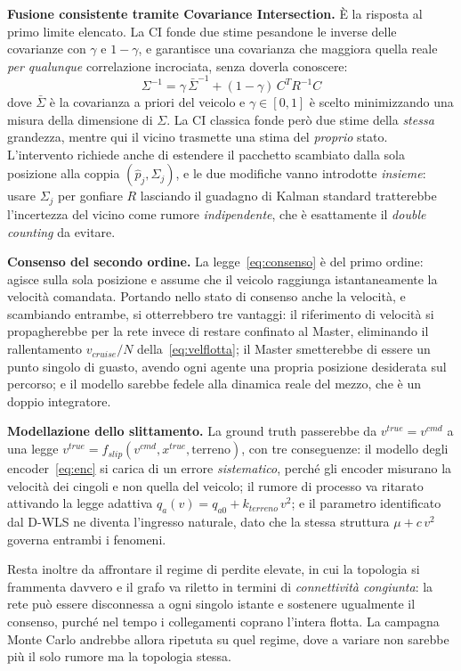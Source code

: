 \documentclass[conference,9pt]{IEEEtran}
\begin{document}
\textbf{Fusione consistente tramite Covariance Intersection.} \`E la risposta
al primo limite elencato. La CI \cite{julier1997} fonde due stime pesandone le
inverse delle covarianze con $\gamma$ e $1-\gamma$, e garantisce una covarianza
che maggiora quella reale \emph{per qualunque} correlazione incrociata, senza
doverla conoscere:
\begin{equation}
\Sigma^{-1} = \gamma\,\bar\Sigma^{-1} + (1-\gamma)\,C^T R^{-1} C
\label{eq:ci}
\end{equation}
dove $\bar\Sigma$ \`e la covarianza a priori del veicolo e $\gamma \in [0,1]$
\`e scelto minimizzando una misura della dimensione di $\Sigma$. La CI classica
fonde per\`o due stime della \emph{stessa} grandezza, mentre qui il vicino
trasmette una stima del \emph{proprio} stato.
L'intervento richiede anche di
estendere il pacchetto scambiato dalla sola posizione alla coppia
$(\hat p_j, \Sigma_j)$, e le due modifiche vanno introdotte \emph{insieme}:
usare $\Sigma_j$ per gonfiare $R$ lasciando il guadagno di Kalman standard
tratterebbe l'incertezza del vicino come rumore \emph{indipendente}, che \`e
esattamente il \emph{double counting} da evitare.

\textbf{Consenso del secondo ordine.} La legge~\eqref{eq:consenso} \`e del primo
ordine: agisce sulla sola posizione e assume che il veicolo raggiunga
istantaneamente la velocit\`a comandata. Portando nello stato di consenso anche
la velocit\`a, e scambiando entrambe, si otterrebbero tre vantaggi: il
riferimento di velocit\`a si propagherebbe per la rete invece di restare
confinato al Master, eliminando il rallentamento $v_{cruise}/N$
della~\eqref{eq:velflotta}; il Master smetterebbe di essere un punto singolo di
guasto, avendo ogni agente una propria posizione desiderata sul percorso; e il
modello sarebbe fedele alla dinamica reale del mezzo, che \`e un doppio
integratore.

\textbf{Modellazione dello slittamento.} La ground truth passerebbe da
$v^{true} = v^{cmd}$ a una legge $v^{true} = f_{slip}(v^{cmd}, x^{true},
\text{terreno})$, con tre conseguenze: il modello degli encoder~\eqref{eq:enc}
si carica di un errore \emph{sistematico}, perch\'e gli encoder misurano la
velocit\`a dei cingoli e non quella del veicolo; il rumore di processo va
ritarato attivando la legge adattiva $q_a(v) = q_{a0} + k_{terreno}\,v^2$; e il
parametro identificato dal D-WLS ne diventa l'ingresso naturale, dato che la
stessa struttura $\mu + c\,v^2$ governa entrambi i fenomeni.

Resta inoltre da affrontare il regime di perdite elevate, in cui la topologia
si frammenta davvero e il grafo va riletto in termini di \emph{connettivit\`a
congiunta}: la rete pu\`o essere disconnessa a ogni singolo istante e sostenere
ugualmente il consenso, purch\'e nel tempo i collegamenti coprano l'intera
flotta. La campagna Monte Carlo andrebbe allora ripetuta su quel regime, dove a
variare non sarebbe pi\`u il solo rumore ma la topologia stessa.
\end{document}
